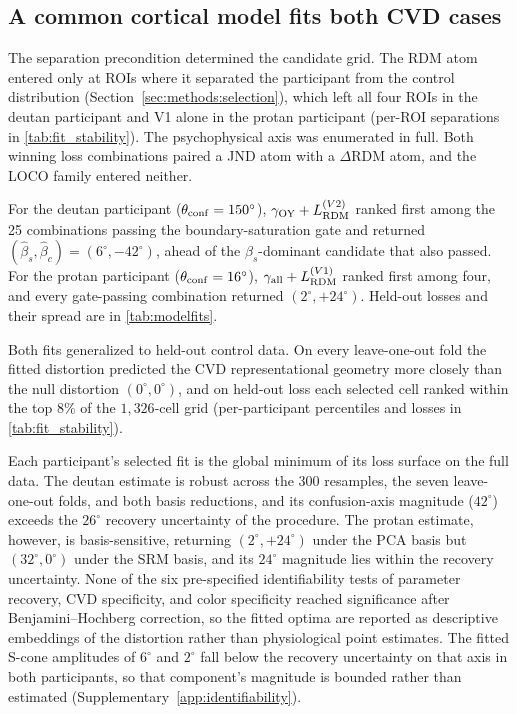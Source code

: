 \subsection{A common cortical model fits both CVD cases}
\label{sec:results:twocomp}

The separation precondition determined the candidate grid. The RDM atom entered only at ROIs where it separated the participant from the control distribution (Section~\ref{sec:methods:selection}), which left all four ROIs in the deutan participant and V1 alone in the protan participant (per-ROI separations in \cref{tab:fit_stability}). The psychophysical axis was enumerated in full. Both winning loss combinations paired a JND atom with a $\Delta$RDM atom, and the LOCO family entered neither.

For the deutan participant ($\theta_{\rm conf} = 150^\circ$), $\gamma_{\rm OY} + L_{\rm RDM}^{(V2)}$ ranked first among the 25 combinations passing the boundary-saturation gate and returned $(\hat\beta_s, \hat\beta_c) = (6^\circ, -42^\circ)$, ahead of the $\beta_s$-dominant candidate that also passed. For the protan participant ($\theta_{\rm conf} = 16^\circ$), $\gamma_{\rm all} + L_{\rm RDM}^{(V1)}$ ranked first among four, and every gate-passing combination returned $(2^\circ, +24^\circ)$. Held-out losses and their spread are in \cref{tab:modelfits}.

Both fits generalized to held-out control data. On every leave-one-out fold the fitted distortion predicted the CVD representational geometry more closely than the null distortion $(0^\circ, 0^\circ)$, and on held-out loss each selected cell ranked within the top $8\%$ of the $1{,}326$-cell grid (per-participant percentiles and losses in \cref{tab:fit_stability}).

Each participant's selected fit is the global minimum of its loss surface on the full data. The deutan estimate is robust across the 300 resamples, the seven leave-one-out folds, and both basis reductions, and its confusion-axis magnitude ($42^\circ$) exceeds the $26^\circ$ recovery uncertainty of the procedure. The protan estimate, however, is basis-sensitive, returning $(2^\circ, +24^\circ)$ under the PCA basis but $(32^\circ, 0^\circ)$ under the SRM basis, and its $24^\circ$ magnitude lies within the recovery uncertainty. None of the six pre-specified identifiability tests of parameter recovery, CVD specificity, and color specificity reached significance after Benjamini--Hochberg correction, so the fitted optima are reported as descriptive embeddings of the distortion rather than physiological point estimates. The fitted S-cone amplitudes of $6^\circ$ and $2^\circ$ fall below the recovery uncertainty on that axis in both participants, so that component's magnitude is bounded rather than estimated (Supplementary~\cref{app:identifiability}).

